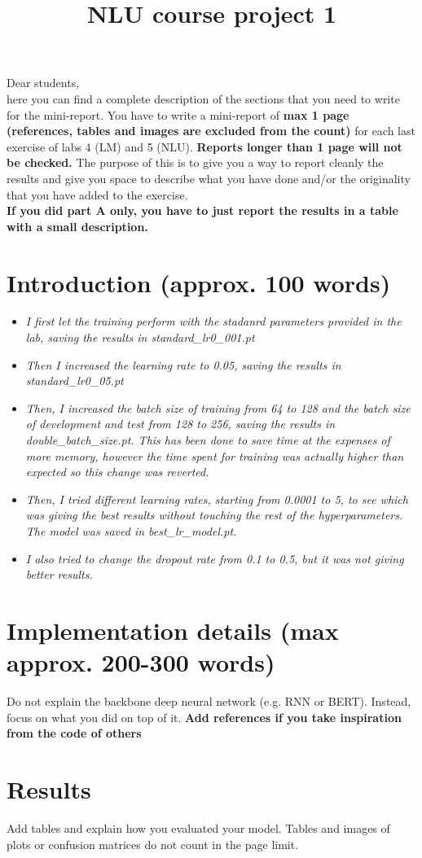 \documentclass[a4paper]{article}
\title{NLU course project 1}
\begin{document}
\maketitle

Dear students, \\
here you can find a complete description of the sections that you need to write for the mini-report. You have to write a mini-report of \textbf{max 1 page (references, tables and images are excluded from the count)} for each last exercise of labs 4 (LM) and 5 (NLU). \textbf{Reports longer than 1 page will not be checked.} The purpose of this is to give you a way to report cleanly the results and give you space to describe what you have done and/or the originality that you have added to the exercise.
\\
\textbf{If you did part A only, you have to just report the results in a table with a small description.}

\section{Introduction (approx. 100 words)}
\begin{itemize}
    \item \textit{I first let the training perform with the stadanrd parameters provided in the lab, saving the results in standard_lr0_001.pt}
    \item \textit{Then I increased the learning rate to 0.05, saving the results in standard_lr0_05.pt}
    \item \textit{Then, I increased the batch size of training from 64 to 128 and the batch size of development and test from 128 to 256, saving the results in double_batch_size.pt. This has been done to save time at the expenses of more memory, however the time spent for training was actually higher than expected so this change was reverted.}
    \item \textit{Then, I tried different learning rates, starting from 0.0001 to 5, to see which was giving the best results without touching the rest of the hyperparameters. The model was saved in best_lr_model.pt.}
    \item \textit{I also tried to change the dropout rate from 0.1 to 0.5, but it was not giving better results.}
\end{itemize}
\section{Implementation details (max approx. 200-300 words)}
Do not explain the backbone deep neural network (e.g. RNN or BERT). Instead, focus on what you did on top of it. \textbf{Add references if you take inspiration from the code of others}

\section{Results}
Add tables and explain how you evaluated your model. Tables and images of plots or confusion matrices do not count in the page limit.





\end{document}

